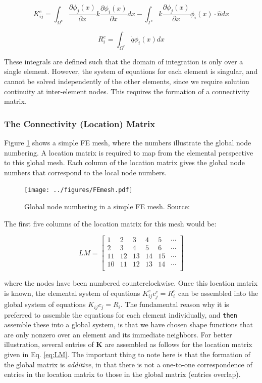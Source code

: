 \documentclass[10pt]{article}
\newcommand{\beq}{\begin{equation}}
\newcommand{\eeq}{\end{equation}}
\begin{document}
\beq
K_{ij}^e=\int_{\Omega^e}\frac{\partial \phi_j(x)}{\partial x}k\frac{\partial\phi_i(x)}{\partial x}dx-\int_{\Gamma^e}k\frac{\partial \phi_j(x)}{\partial x}\phi_i(x)\cdot\hat{n}dx
\eeq

\beq
R_{i}^e=\int_{\Omega^e}\dot{q}\phi_i(x)dx
\eeq

These integrals are defined such that the domain of integration is only over a single element. However, the system of equations for each element is singular, and cannot be solved independently of the other elements, since we require solution continuity at inter-element nodes. This requires the formation of a connectivity matrix.

\subsubsection{The Connectivity (Location) Matrix}
Figure \ref{fig:FEmesh} shows a simple FE mesh, where the numbers illustrate the global node numbering. A location matrix is required to map from the elemental perspective to this global mesh. Each column of the location matrix gives the global node numbers that correspond to the local node numbers. 

\begin{figure}[H]
\centering
\texttt{[image: ../figures/FEmesh.pdf]}
\caption{Global node numbering in a simple FE mesh. Source:}
\label{fig:FEmesh}
\end{figure}

The first five columns of the location matrix for this mesh would be:

\beq
\label{eq:LM}
LM=\begin{bmatrix}
1 & 2 & 3 & 4 & 5 & \cdots\\
2 & 3 & 4 & 5 & 6 & \cdots\\
11 & 12 & 13 & 14 & 15 & \cdots\\
10 & 11 & 12 & 13 & 14 & \cdots\\
\end{bmatrix}
\eeq

where the nodes have been numbered counterclockwise. Once this location matrix is known, the elemental system of equations \(K_{ij}^ec_j^e=R_i^e\) can be assembled into the global system of equations \(K_{ij}c_j=R_i\). The fundamental reason why it is preferred to assemble the equations for each element individually, and {\tt then} assemble these into a global system, is that we have chosen shape functions that are only nonzero over an element and its immediate neighbors. For better illustration, several entries of \textbf{K} are assembled as follows for the location matrix given in Eq. \eqref{eq:LM}. The important thing to note here is that the formation of the global matrix is {\it additive}, in that there is not a one-to-one correspondence of entries in the location matrix to those in the global matrix (entries overlap).
\end{document}
